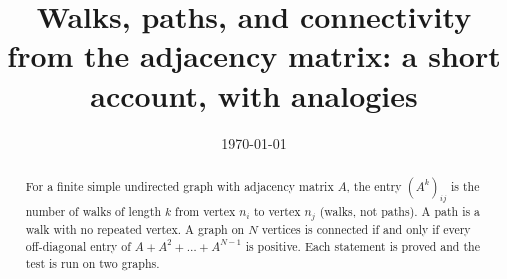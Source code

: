 \documentclass[11pt,a4paper]{article}
\title{Walks, paths, and connectivity from the adjacency matrix: a short account, with analogies}
\author{}
\date{\today}
\theoremstyle{definition}
\theoremstyle{plain}
\theoremstyle{remark}
\begin{document}
\maketitle

\begin{abstract}
For a finite simple undirected graph with adjacency matrix $A$, the entry
$(A^k)_{ij}$ is the number of walks of length $k$ from vertex $n_i$ to vertex $n_j$
(walks, not paths). A path is a walk with no repeated vertex. A graph on $N$ vertices is
connected if and only if every off-diagonal entry of $A+A^2+\dots+A^{N-1}$ is
positive. Each statement is proved and the test is run on two graphs.
\end{abstract}






\printbibliography
\end{document}
